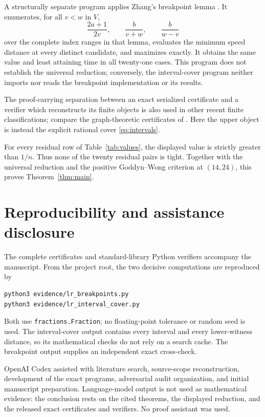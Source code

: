 \documentclass[11pt]{article}
\begin{document}
A structurally separate program applies Zhang's breakpoint lemma
\cite[Lemma~2.2]{Zhang2026}.  It enumerates, for all \(v<w\) in \(V\),
\[
 \frac{2a+1}{2v},\qquad \frac{b}{v+w},\qquad \frac{b}{w-v}
\]
over the complete index ranges in that lemma, evaluates the minimum speed
distance at every distinct candidate, and maximizes exactly.  It obtains the
same value and least attaining time in all twenty-one cases.  This program
does not establish the universal reduction; conversely, the interval-cover
program neither imports nor reads the breakpoint implementation or its
results.

The proof-carrying separation between an exact serialized certificate and a
verifier which reconstructs its finite objects is also used in other recent
finite classifications; compare the graph-theoretic certificates of
\cite[Section~6]{ZengEtAl2026}.  Here the upper object is instead the explicit
rational cover \eqref{eq:intervals}.

For every residual row of Table~\ref{tab:values}, the displayed value is
strictly greater than \(1/n\).  Thus none of the twenty residual pairs is
tight.  Together with the universal reduction and the positive
Goddyn--Wong criterion at \((14,24)\), this proves
Theorem~\ref{thm:main}.

\section*{Reproducibility and assistance disclosure}

The complete certificates and standard-library Python verifiers accompany
the manuscript.  From the project root, the two decisive computations are
reproduced by
\begin{verbatim}
python3 evidence/lr_breakpoints.py
python3 evidence/lr_interval_cover.py
\end{verbatim}
Both use \texttt{fractions.Fraction}; no floating-point tolerance or random
seed is used.  The interval-cover output contains every interval and every
lower-witness distance, so its mathematical checks do not rely on a search
cache.  The breakpoint output supplies an independent exact cross-check.

OpenAI Codex assisted with literature search, source-scope reconstruction,
development of the exact programs, adversarial audit organization, and
initial manuscript preparation.  Language-model output is not used as
mathematical evidence: the conclusion rests on the cited theorems, the
displayed reduction, and the released exact certificates and verifiers.  No
proof assistant was used.



\end{document}
